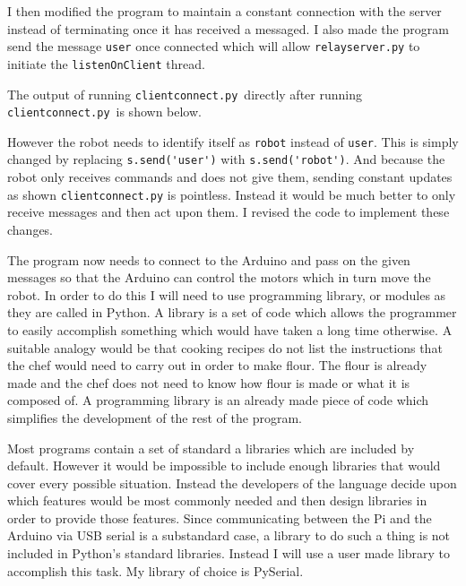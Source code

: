 \documentclass[]{report}   %
\begin{document}
						I then modified the program to maintain a constant connection with the server instead of terminating once it has received a messaged. I also made the
						program send the message \lstinline{user} once connected which will allow \lstinline{relayserver.py} to initiate the \lstinline{listenOnClient} thread.
							
						
						The output of running \lstinline{clientconnect.py}\  directly after running \lstinline{clientconnect.py}\ is shown below.
						
						
						However the robot needs to identify itself as \lstinline{robot} instead of \lstinline{user}. This is simply changed by replacing \lstinline{s.send('user')}
						with \lstinline{s.send('robot')}. And because the robot only receives commands and does not give them, sending constant updates as shown
						\lstinline{clientconnect.py} is pointless. Instead it would be much better to only receive messages and then act upon them. I revised the code to
						implement these changes. 	
						
						The program now needs to connect to the Arduino and pass on the given messages so that the Arduino can control the motors which in turn move the robot. In
						order to do this I will need to use programming library, or modules as they are called in Python. A library is a set of code which allows the programmer to
						easily accomplish something which would have taken a long time otherwise. A suitable analogy would be that cooking recipes do not list the instructions that
						the chef would need to carry out in order to make flour. The flour is already made and the chef does not need to know how flour is made or what it is
						composed of. A programming library is an already made piece of code which simplifies the development of the rest of the program.
						
						Most programs contain a set of standard a libraries which are included by default. However it would be impossible to include enough libraries that would cover every
						possible situation. Instead the developers of the language decide upon which features would be most commonly needed and then design libraries in order to provide
						those features. Since communicating between the Pi and the Arduino via USB serial is a substandard case, a library to do such a thing is not included in Python's
						standard libraries. Instead I will use a user made library to accomplish this task. My library of choice is PySerial\cite{pyserial}.
						
\end{document}
